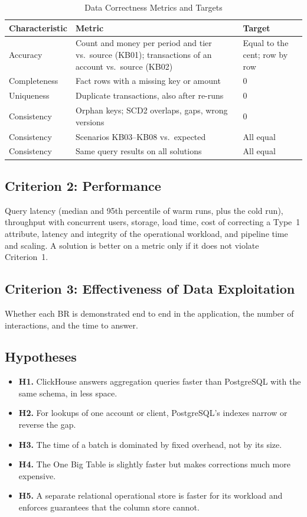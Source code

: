 \documentclass[peerreview]{IEEEtran}
\begin{document}
\begin{table}[!t]
\centering
\caption{Data Correctness Metrics and Targets}
\label{tab:correctness-criteria}
\footnotesize
\setlength{\tabcolsep}{3pt}
\begin{tabular}{L{1.85cm} L{3.9cm} L{1.5cm}}
\toprule
\textbf{Character\-istic} & \textbf{Metric} & \textbf{Target} \\
\midrule
Accuracy & Count and money per period and tier vs.\ source (KB01); transactions of an account vs.\ source (KB02) & Equal to the cent; row by row \\
Completeness & Fact rows with a missing key or amount & 0 \\
Uniqueness & Duplicate transactions, also after re-runs & 0 \\
Consistency & Orphan keys; SCD2 overlaps, gaps, wrong versions & 0 \\
Consistency & Scenarios KB03--KB08 vs.\ expected & All equal \\
Consistency & Same query results on all solutions & All equal \\
\bottomrule
\end{tabular}
\end{table}

\subsection{Criterion 2: Performance}
Query latency (median and 95th percentile of warm runs, plus the cold run), throughput with
concurrent users, storage, load time, cost of correcting a Type~1 attribute, latency and
integrity of the operational workload, and pipeline time and scaling. A solution is better on
a metric only if it does not violate Criterion~1.

\subsection{Criterion 3: Effectiveness of Data Exploitation}
Whether each BR is demonstrated end to end in the application, the number of interactions,
and the time to answer.

\subsection{Hypotheses}
\begin{itemize}
  \item \textbf{H1.} ClickHouse answers aggregation queries faster than PostgreSQL with the
        same schema, in less space.
  \item \textbf{H2.} For lookups of one account or client, PostgreSQL's indexes narrow or
        reverse the gap.
  \item \textbf{H3.} The time of a batch is dominated by fixed overhead, not by its size.
  \item \textbf{H4.} The One Big Table is slightly faster but makes corrections much more
        expensive.
  \item \textbf{H5.} A separate relational operational store is faster for its workload and
        enforces guarantees that the column store cannot.
\end{itemize}
\end{document}
